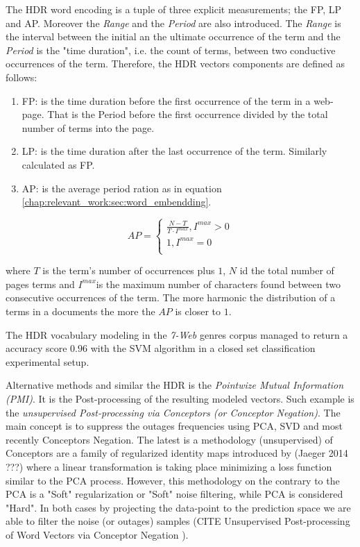 The HDR word encoding is a tuple of three explicit measurements; the FP, LP and AP. Moreover the \textit{Range} and the \textit{Period} are also introduced. The \textit{Range} is the interval between the initial an the ultimate occurrence of the term and the \textit{Period} is the "time duration", i.e. the count of terms, between two conductive occurrences of the term. Therefore, the HDR vectors components are defined as follows:

\begin{enumerate}
\item FP: is the time duration before the first occurrence of the term in a web-page. That is the Period before the first occurrence divided by the total number of terms into the page.
\item LP: is the time duration after the last occurrence of the term. Similarly calculated as FP.
\item AP: is the average period ration as in equation \ref{chap:relevant_work:sec:word_embendding}.
\end{enumerate}

\begin{equation}\label{chap:relevant_work:sec:word_embendding}
	AP  =
      \begin{cases}
        \frac{N - T}{T \cdot I^{max}}, I^{max} > 0  \\
        1, I^{max} = 0 \\ 
       \end{cases}
\end{equation}

\noindent
where $T$ is the term's number of occurrences plus $1$, $N$ id the total number of pages terms and $I^{max}$is the maximum number of characters found between two consecutive occurrences of the term. The more harmonic the distribution of a terms in a documents the more the $AP$ is closer to $1$.

The HDR vocabulary modeling in the \textit{7-Web} genres corpus managed to return a accuracy score $0.96$ with the SVM algorithm in a closed set classification experimental setup.

Alternative methods and similar the HDR is the \textit{Pointwize Mutual Information (PMI)}. It is the Post-processing of the resulting modeled vectors. Such example is the \textit{unsupervised Post-processing via Conceptors (or Conceptor Negation)}. The main concept is to suppress the outages frequencies using PCA, SVD and most recently Conceptors Negation. The latest is a methodology (unsupervised) of Conceptors are a family of regularized identity maps introduced by (Jaeger 2014 ???) where a linear transformation is taking place minimizing a loss function similar to the PCA process. However, this methodology on the contrary to the PCA is a "Soft" regularization or "Soft" noise filtering, while PCA is considered "Hard". In both cases by projecting the data-point to the prediction space we are able to filter the noise (or outages) samples (CITE Unsupervised Post-processing of Word Vectors via Conceptor Negation ).

